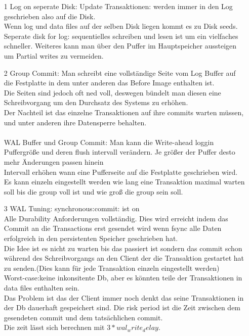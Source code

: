 \documentclass[12pt]{article}\pagestyle{myheadings}
\theoremstyle{plain}
\begin{document}
\begin{enumerate}
\begin{itemize}
\item[1] Log on seperate Disk:
Update Transaktionen: werden immer in den Log geschrieben also auf die Disk.\\
Wenn log und data files auf der selben Disk liegen kommt es zu Disk seeds.\\
Seperate disk for log: sequentielles schreiben und lesen ist um ein vielfaches schneller.
Weiteres kann man über den Puffer im Hauptspeicher aussteigen um Partial writes zu vermeiden.
\item[2]Group Commit: Man schreibt eine vollständige Seite vom Log Buffer auf die Festplatte in dem unter anderen das Before Image enthalten ist.\\
Die Seiten sind jedoch oft ned voll, deswegen bündelt man diesen eine Schreibvorgang um den Durchsatz des Systems zu erhöhen.\\
Der Nachteil ist das einzelne Transaktionen auf ihre commits warten müssen, und unter anderen ihre Datensperre behalten.\\ \\
WAL Buffer und Group Commit:
Man kann die Write-ahead loggin Puffergröße und deren flush intervall verändern. Je größer der Puffer desto mehr Änderungen passen hinein\\
Intervall erhöhen wann eine Pufferseite auf die Festplatte geschrieben wird.
Es kann einzeln eingestellt werden wie lang eine Transaktion maximal warten soll bis die group voll ist und wie groß die group sein soll.
\item[3]WAL Tuning: synchronous:commit: ist on\\
Alle Durability Anforderungen vollständig.
Dies wird erreicht indem das Commit an die Transactions erst gesendet wird wenn fsync alle Daten erfolgreich in den persistenten Speicher geschrieben hat.\\
Die Idee ist es nicht zu warten bis das passiert ist sondern das commit schon während des Schreibvorgangs an den Client der die Transaktion gestartet hat zu senden.(Dies kann für jede Transaktion einzeln eingestellt werden)\\
Worst-case:keine inkonsitente Db, aber es könnten teile der Transaktionen in data files enthalten sein.\\Das Problem ist das der Client immer noch denkt das seine Transaktionen in der Db dauerhaft gespeichert sind.
Die risk period ist die Zeit zwischen dem gesendeten commit und dem tatsächlichen commit.\\
Die zeit lässt sich berechnen mit $3* wal_write_delay$.\\

\end{itemize}
\end{enumerate}
\end{document}
